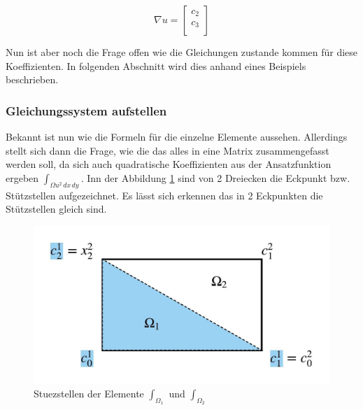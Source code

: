 \begin{equation}
	\nabla u = 	
	\left[ \begin{array}{r}
	c_2  \\
	c_3 \\
	\end{array}\right]
	\label{fem:equationSchwarzquadratischP}
\end{equation} 

Nun ist aber noch die Frage offen wie die Gleichungen zustande kommen für diese Koeffizienten. In folgenden Abschnitt wird dies anhand eines Beispiels beschrieben.

\subsubsection{Gleichungssystem aufstellen 
\label{fem:section:GL}}

Bekannt ist nun wie die Formeln für die einzelne Elemente aussehen. Allerdings stellt sich dann die Frage, wie die das alles in eine Matrix zusammengefasst werden soll, da sich auch quadratische Koeffizienten aus der Ansatzfunktion ergeben $\int_{\Omega u^2 \, dx \, dy}$. Inn der Abbildung \ref{fem:Stuestellen} sind von 2 Dreiecken die Eckpunkt bzw. Stützstellen aufgezeichnet. Es lässt sich erkennen das in 2 Eckpunkten die Stützstellen gleich sind.
\begin{figure}[h]
	\centering
	\includegraphics[scale=0.8]{papers/fem/Images/Stuezstellen.jpeg}
	\caption{Stuezstellen der Elemente $\int_{\Omega_1}$ und $\int_{\Omega_2}$ }
	\label{fem:Stuestellen}
\end{figure}

